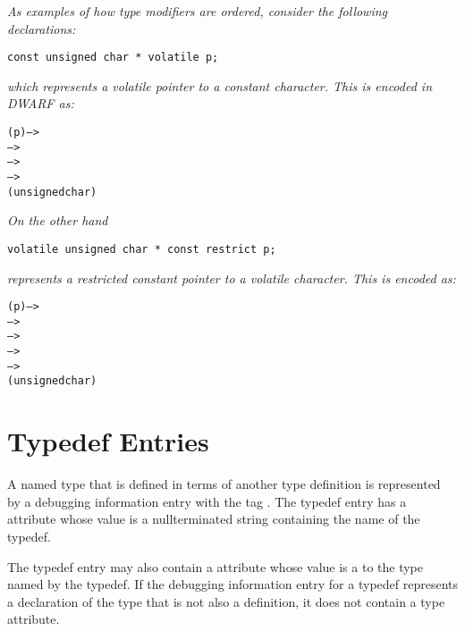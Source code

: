 \textit{As examples of how type modifiers are ordered, consider the following
 declarations:}
\begin{lstlisting}[numbers=none]
   const unsigned char * volatile p;
\end{lstlisting}
\textit{which represents a volatile pointer to a constant
character. This is encoded in DWARF as:}

\begin{dwflisting}
\begin{alltt}
        \DWTAGvariable(p) -->
            \DWTAGvolatiletype -->
                \DWTAGpointertype -->
                    \DWTAGconsttype -->
                        \DWTAGbasetype(unsigned char)
\end{alltt}
\end{dwflisting}

\textit{On the other hand}
\begin{lstlisting}[numbers=none]                        
   volatile unsigned char * const restrict p;
\end{lstlisting}
\textit{represents a restricted constant
pointer to a volatile character. This is encoded as:}

\begin{dwflisting}
\begin{alltt}
        \DWTAGvariable(p) -->
            \DWTAGrestricttype -->
                \DWTAGconsttype -->
                    \DWTAGpointertype -->
                        \DWTAGvolatiletype -->
                            \DWTAGbasetype(unsigned char)
\end{alltt}
\end{dwflisting}

\section{Typedef Entries}
\label{chap:typedefentries}
A named type that is defined in terms of another type
definition is represented by a debugging information entry with
the tag \DWTAGtypedefTARG. 
The typedef entry has a \DWATname{} attribute 
whose value is a null\dash terminated string containing
the name of the typedef.
\bbeb

The typedef entry may also contain 
a 
\DWATtype{} attribute whose
value is a  
to the type named by the typedef. If
the debugging information entry for a typedef represents
a declaration of the type that is not also a definition,
it does not contain a type attribute.

